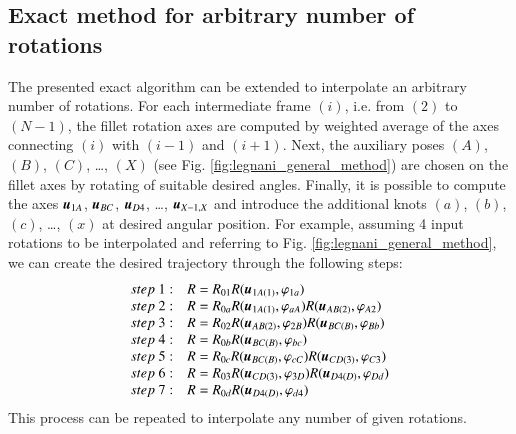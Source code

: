 \subsection{Exact method for arbitrary number of rotations}
\label{subsec:connetti_esatto_general}
The presented exact algorithm can be extended to interpolate an arbitrary number of rotations. For each intermediate frame $(i)$, i.e. from $(2)$ to $(N-1)$, the fillet rotation axes are computed by weighted average of the axes connecting $(i)$ with $(i-1)$ and $(i+1)$. Next, the auxiliary poses $(A)$, $(B)$, $(C)$, \ldots, $(X)$ (see Fig. \ref{fig:legnani_general_method}) are chosen on the fillet axes by rotating of suitable desired angles. Finally, it is possible to compute the axes ${\boldsymbol{u}}_{1A}$, ${\boldsymbol{u}}_{BC}$, ${\boldsymbol{u}}_{D4}$, \ldots, ${\boldsymbol{u}}_{X-1, X}$ and introduce the additional knots $(a)$, $(b)$, $(c)$, \ldots, $(x)$ at desired angular position. For example, assuming 4 input rotations to be interpolated and referring to Fig. \ref{fig:legnani_general_method}, we can create the desired trajectory through the following steps:
\begin{equation}
    \begin{array}{ll}
        step\ 1: & R = R_{01} R({\boldsymbol{u}}_{1A(1)}, \varphi_{1a})\\
        
        step\ 2: & R = R_{0a} R({\boldsymbol{u}}_{1A(1)}, \varphi_{aA}) R({\boldsymbol{u}}_{AB(2)}, \varphi_{A2})\\
        
        step\ 3: & R = R_{02} R({\boldsymbol{u}}_{AB(2)}, \varphi_{2B}) R({\boldsymbol{u}}_{BC(B)}, \varphi_{Bb})\\
        
        step\ 4: & R = R_{0b} R({\boldsymbol{u}}_{BC(B)}, \varphi_{bc})\\
        
        step\ 5: & R = R_{0c} R({\boldsymbol{u}}_{BC(B)}, \varphi_{cC}) R({\boldsymbol{u}}_{CD(3)}, \varphi_{C3})\\
        
        step\ 6: & R = R_{03} R({\boldsymbol{u}}_{CD(3)}, \varphi_{3D}) R({\boldsymbol{u}}_{D4(D)}, \varphi_{Dd})\\
        
        step\ 7: & R = R_{0d} R({\boldsymbol{u}}_{D4(D)}, \varphi_{d4})\\
    \end{array}
\end{equation}
This process can be repeated to interpolate any number of given rotations.

